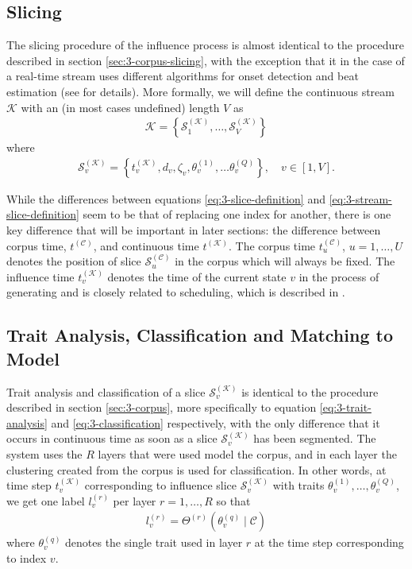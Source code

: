 \subsection{Slicing}\label{sec:3-influence-slicing}
The slicing procedure of the influence process is almost identical to the procedure described in section \ref{sec:3-corpus-slicing}, with the exception that it in the case of a real-time stream uses different algorithms for onset detection and beat estimation (see \cite{borg_2019} for details). More formally, we will define the continuous stream $\mathcal K$ with an (in most cases undefined) length $V$ as
\begin{align}
	\mathcal K 	= \left\lbrace \mathcal S_1^{(\mathcal K)}, \dots, \mathcal S_V^{(\mathcal K)} \right\rbrace
\end{align}
where
\begin{align}\label{eq:3-stream-slice-definition}
	\mathcal S_v^{(\mathcal K)} = \left\lbrace t_v^{(\mathcal K)}, d_v, \zeta_v, \theta_v^{(1)},\dots\theta_v^{(Q)}\right\rbrace, \quad v \in [1, V].
\end{align}

While the differences between equations \ref{eq:3-slice-definition} and \ref{eq:3-stream-slice-definition} seem to be that of replacing one index for another, there is one key difference that will be important in later sections: the difference between corpus time, $t^{(\mathcal C)}$, and continuous time $t^{(\mathcal K)}$. The corpus time $t^{(\mathcal C)}_u$, $u=1,\dots,U$ denotes the position of slice $\mathcal S_u^{(\mathcal C)}$ in the corpus which will always be fixed. The influence time $t^{(\mathcal K)}_v$ denotes the time of the current state $v$ in the process of generating and is closely related to scheduling, which is described in \cite{somaxsoftware2021}.


\subsection{Trait Analysis, Classification and Matching to Model}\label{sec:3-influence-traits}
Trait analysis and classification of a slice $\mathcal S_v^{(\mathcal K)}$ is identical to the procedure described in section \ref{sec:3-corpus}, more specifically to equation \ref{eq:3-trait-analysis} and \ref{eq:3-classification} respectively, with the only difference that it occurs in continuous time as soon as a slice $\mathcal S_v^{(\mathcal K)}$ has been segmented. 
The system uses the $R$ layers that were used model the corpus, and in each layer the clustering created from the corpus is used for classification. In other words, at time step $t^{(\mathcal K)}_v$ corresponding to influence slice $\mathcal S_v^{(\mathcal K)}$ with traits $\theta_v^{(1)},\dots,\theta_v^{(Q)}$, we get one label $l_v^{(r)}$ per layer $r = 1,\dots, R$ so that 
\begin{align}\label{eq:3-influence-classification}
	l_v^{(r)} = \Theta^{(r)}\left(\theta^{(q)}_v \mid \mathcal C \right)
\end{align}
where $\theta^{(q)}_v$ denotes the single trait used in layer $r$ at the time step corresponding to index $v$.


